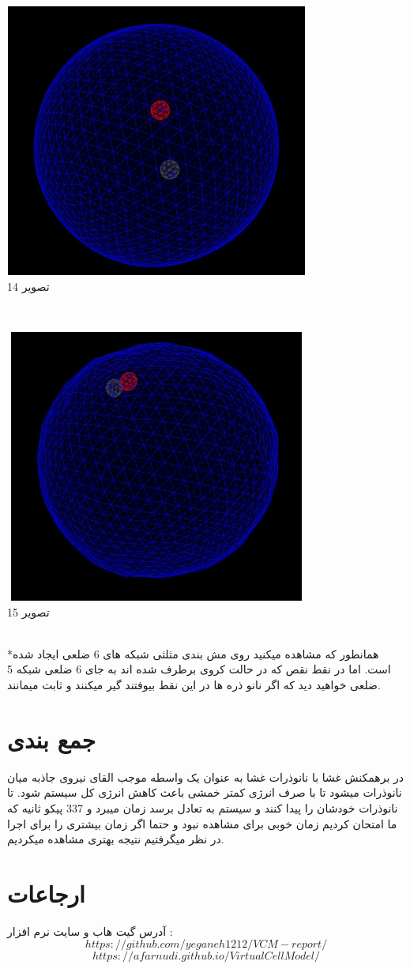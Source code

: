 \documentclass[12pt,onecolumn,a4paper]{report}
\begin{document}
\begin{center}
\includegraphics[width=10cm, height=9cm]{14.jpg}\\
\caption{تصویر 14}
\end{center}\\

\begin{center}
\includegraphics[width=10cm, height=9cm]{15.jpg}\\
\caption{تصویر 15}
\end{center}\\
*همانطور که مشاهده میکنید روی مش بندی مثلثی شبکه های 6 ضلعی ایجاد شده است. اما در نقط نقص که در حالت کروی برطرف شده اند به جای 6 ضلعی شبکه 5 ضلعی خواهید دید که اگر نانو ذره ها در این نقط بیوفتند گیر میکنند و ثابت میمانند.



\section{\LARGE{جمع بندی}}
در برهمکنش غشا با نانوذرات غشا به عنوان یک واسطه موجب القای نیروی جاذبه میان نانوذرات میشود تا با صرف انرژی کمتر خمشی باعث کاهش انرژی کل سیستم شود.
تا نانوذرات خودشان را پیدا کنند و سیستم به تعادل برسد زمان میبرد و 337 پیکو ثانیه که ما امتحان کردیم زمان خوبی برای مشاهده نبود و  حتما اگر زمان بیشتری را برای اجرا در نظر میگرفتیم نتیجه بهتری مشاهده میکردیم.\\




\section{\LARGE{ارجاعات}}

آدرس گیت هاب و سایت نرم افزار :\\
$$https://github.com/yeganeh1212/VCM-report/$$
$$https://afarnudi.github.io/VirtualCellModel/$$
\end{document}
